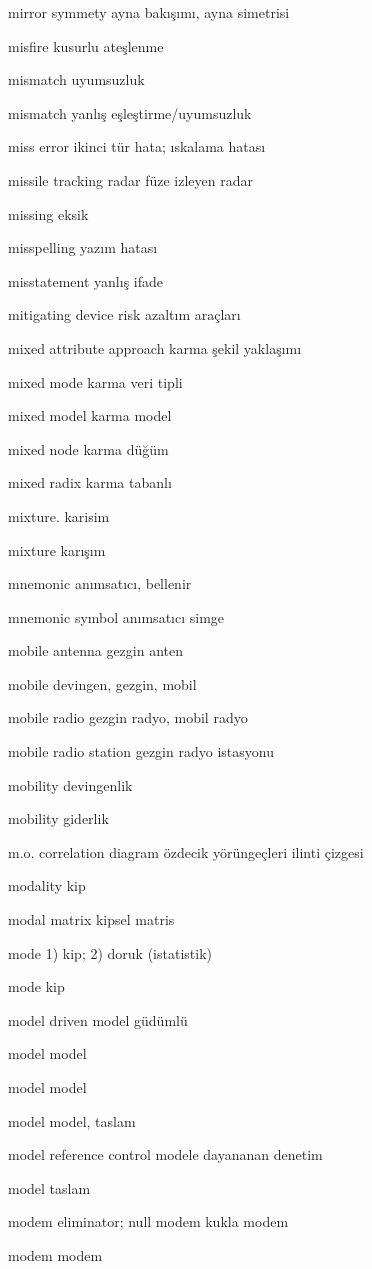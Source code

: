 \documentclass[12pt,fleqn]{article}\usepackage{../../common}
\begin{document}
mirror symmety ayna bakışımı, ayna simetrisi

misfire kusurlu ateşlenme

mismatch uyumsuzluk

mismatch yanlış eşleştirme/uyumsuzluk

miss error ikinci tür hata; ıskalama hatası

missile tracking radar füze izleyen radar

missing eksik

misspelling yazım hatası

misstatement yanlış ifade

mitigating device risk azaltım araçları

mixed attribute approach karma şekil yaklaşımı

mixed mode karma veri tipli

mixed model karma model

mixed node karma düğüm

mixed radix karma tabanlı

mixture. karisim

mixture karışım

mnemonic anımsatıcı, bellenir

mnemonic symbol anımsatıcı simge

mobile antenna gezgin anten

mobile devingen, gezgin, mobil

mobile radio gezgin radyo, mobil radyo

mobile radio station gezgin radyo istasyonu

mobility devingenlik

mobility giderlik

m.o. correlation diagram özdecik yörüngeçleri ilinti çizgesi

modality kip

modal matrix kipsel matris

mode 1) kip; 2) doruk (istatistik)

mode kip

model driven model güdümlü

model model

model model

model model, taslam

model reference control modele dayananan denetim

model taslam

modem eliminator; null modem kukla modem

modem modem
\end{document}
